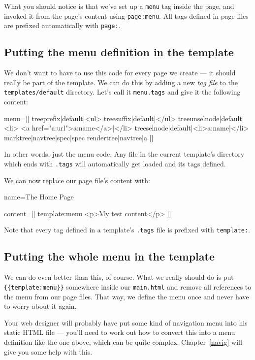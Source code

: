 What you should notice is that we've set up a \texttt{menu} tag inside the page, and invoked it
from the page's content using \texttt{page:menu}. All tags defined in page files are prefixed
automatically with \texttt{page:}.

\subsection{Putting the menu definition in the template}
We don't want to have to use this code for every page we create --- it should really be part of
the template. We can do this by adding a new \emph{tag file} to the \texttt{templates/default}
directory. Let's call it \texttt{menu.tags} and give it the following content:
\begin{MyVerbatim}
menu=[[
    {{treeprefix|default|<ul>}}
    {{treesuffix|default|</ul>}}
    {{treeunselnode|default|<li>
        <a href="{{a:url}}">{{a:name}}</a>|</li>}}
    {{treeselnode|default|<li>{{a:name}}|</li>}}
    {{marktree|{{navtree}}|spec|{{spec}}}}
    {{rendertree|{{navtree}}|a}}
]]
\end{MyVerbatim}
In other words, just the menu code. Any file in the current template's directory
which ends with \texttt{.tags} will automatically get loaded and its tags defined.

We can now replace our page file's content with:
\begin{MyVerbatim}
name=The Home Page

content=[[
{{template:menu}}
<p>My test content</p>
]]
\end{MyVerbatim}
Note that every tag defined in a template's \texttt{.tags} file is prefixed with \texttt{template:}.

\subsection{Putting the whole menu in the template}
We can do even better than this, of course. What we really should do is put \verb+{{template:menu}}+
somewhere inside our \texttt{main.html} and remove all references to the menu from our page files.
That way, we define the menu once and never have to worry about it again. 

Your web designer will probably have put some kind of navigation menu into his static HTML file --- you'll
need to work out how to convert this into a menu definition like the one above, which can be quite 
complex. Chapter~\ref{navig} will give you some help with this.

